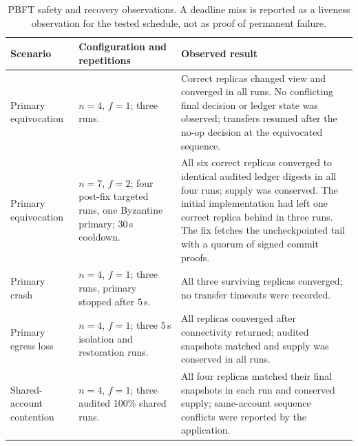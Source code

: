 \documentclass[sigconf,a4paper]{acmart}
\begin{document}
    \begin{table}[t]
        \centering
        \small
        \caption{PBFT safety and recovery observations. A deadline miss is reported as a liveness observation for the tested schedule, not as proof of permanent failure.}
        \label{tab:pbft-safety-results}
        \begin{tabular}{p{3.1cm}p{4.2cm}p{8.7cm}}
            \toprule
            \textbf{Scenario} & \textbf{Configuration and repetitions} & \textbf{Observed result} \\
            \midrule
            Primary equivocation & $n=4$, $f=1$; three runs. & Correct replicas changed view and converged in all runs. No conflicting final decision or ledger state was observed; transfers resumed after the no-op decision at the equivocated sequence. \\
            Primary equivocation & $n=7$, $f=2$; four post-fix targeted runs, one Byzantine primary; 30\,s cooldown. & All six correct replicas converged to identical audited ledger digests in all four runs; supply was conserved. The initial implementation had left one correct replica behind in three runs. The fix fetches the uncheckpointed tail with a quorum of signed commit proofs. \\
            Primary crash & $n=4$, $f=1$; three runs, primary stopped after 5\,s. & All three surviving replicas converged; no transfer timeouts were recorded. \\
            Primary egress loss & $n=4$, $f=1$; three 5\,s isolation and restoration runs. & All replicas converged after connectivity returned; audited snapshots matched and supply was conserved in all runs. \\
            Shared-account contention & $n=4$, $f=1$; three audited 100\% shared runs. & All four replicas matched their final snapshots in each run and conserved supply; same-account sequence conflicts were reported by the application. \\
            \bottomrule
        \end{tabular}
    \end{table}
\end{document}
